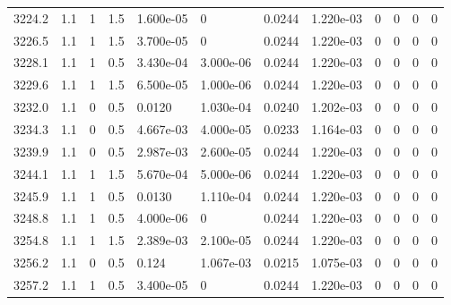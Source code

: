 \documentclass[preview]{standalone}
\begin{document}
{{{{{{{{{{{{{{{{{{\begin{tabular}{L{1.2cm}C{1.2cm} C{0.3cm}C{0.5cm} C{1.4cm}C{1.4cm} C{1.4cm}C{1.4cm} C{1.6cm}C{1.6cm} C{1.6cm}C{1.6cm}}
  3224.2  &   1.1  & 1     & 1.5 &  1.600e-05  & 0  &  0.0244&   1.220e-03& 0 & 0   &  0 & 0  \\ 
  3226.5  &   1.1  & 1     & 1.5 &  3.700e-05  & 0  &  0.0244&   1.220e-03& 0 & 0   &  0 & 0  \\ 
  3228.1  &   1.1  & 1     & 0.5 &  3.430e-04  & 3.000e-06  &  0.0244&   1.220e-03& 0 & 0   &  0 & 0  \\ 
  3229.6  &   1.1  & 1     & 1.5 &  6.500e-05  & 1.000e-06  &  0.0244&   1.220e-03& 0 & 0   &  0 & 0  \\ 
  3232.0  &   1.1  & 0     & 0.5 &  0.0120  & 1.030e-04  &  0.0240&   1.202e-03& 0 & 0   &  0 & 0  \\ 
  3234.3  &   1.1  & 0     & 0.5 &  4.667e-03  & 4.000e-05  &  0.0233&   1.164e-03& 0 & 0   &  0 & 0  \\ 
  3239.9  &   1.1  & 0     & 0.5 &  2.987e-03  & 2.600e-05  &  0.0244&   1.220e-03& 0 & 0   &  0 & 0  \\ 
  3244.1  &   1.1  & 1     & 1.5 &  5.670e-04  & 5.000e-06  &  0.0244&   1.220e-03& 0 & 0   &  0 & 0  \\ 
  3245.9  &   1.1  & 1     & 0.5 &  0.0130  & 1.110e-04  &  0.0244&   1.220e-03& 0 & 0   &  0 & 0  \\ 
  3248.8  &   1.1  & 1     & 0.5 &  4.000e-06  & 0  &  0.0244&   1.220e-03& 0 & 0   &  0 & 0  \\ 
  3254.8  &   1.1  & 1     & 1.5 &  2.389e-03  & 2.100e-05  &  0.0244&   1.220e-03& 0 & 0   &  0 & 0  \\ 
  3256.2  &   1.1  & 0     & 0.5 &  0.124  & 1.067e-03  &  0.0215&   1.075e-03& 0 & 0   &  0 & 0  \\ 
  3257.2  &   1.1  & 1     & 0.5 &  3.400e-05  & 0  &  0.0244&   1.220e-03& 0 & 0   &  0 & 0  \\ 
\hline 
\end{tabular} 

}}}}}}}}}}}}}}}}}}
\end{document}
